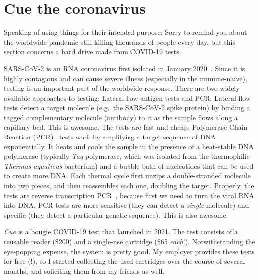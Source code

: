 \documentclass[twocolumn]{article}
\begin{document}
\section{Cue the coronavirus} \label{sec:cue}

Speaking of using things for their intended purpose:
Sorry to remind you about the worldwide pandemic still killing
thousands of people every day, but this section concerns a hard drive
made from COVID-19 tests.

SARS-CoV-2 is an RNA coronavirus first isolated in January
2020~\cite{wu2020coronavirus}. Since it is highly contagious and can
cause severe illness (especially in the immune-na\"ive), testing is an
important part of the worldwide response. There are two widely
available approaches to testing: Lateral flow antigen tests and PCR.
Lateral flow tests detect a target molecule (e.g.~the SARS-CoV-2 spike
protein) by binding a tagged complementary molecule (antibody) to it
as the sample flows along a capillary bed. This is awesome. The tests
are fast and cheap. Polymerase Chain Reaction
(PCR)~\cite{saiki1985enzymatic} tests work by amplifying a target
sequence of DNA exponentially. It heats and cools the sample in the
presence of a heat-stable DNA polymerase (typically {\it Taq}
polymerase, which was isolated from the thermophilic {\it Thermus
  aquaticus} bacterium) and a bubble-bath of nucleotides that can be
used to create more DNA. Each thermal cycle first unzips a
double-stranded molecule into two pieces, and then reassembles each
one, doubling the target. Properly, the tests are reverse
transcription PCR~\cite{bustin2000absolute}, because first we need to
turn the viral RNA into DNA. PCR tests are more sensitive (they can
detect a {\em single} molecule) and specific (they detect a particular
genetic sequence). This is also awesome.

{\it Cue} is a bougie COVID-19 test that launched in 2021. The test
consists of a reusable reader (\$200) and a single-use cartridge (\$65
{\em each}!). Notwithstanding the eye-popping expense, the system is
pretty good. My employer provides these tests for free (!), so I
started collecting the used cartridges over the course of several
months, and soliciting them from my friends as well.
\end{document}
